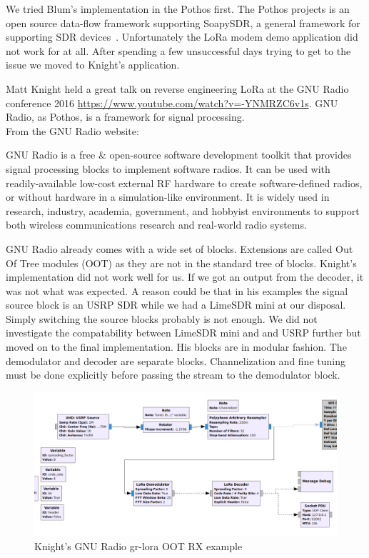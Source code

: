 We tried Blum's implementation in the Pothos  first. The Pothos projects is an open source data-flow framework
supporting SoapySDR, a general framework for supporting SDR devices~\cite{pothos}.
Unfortunately the LoRa modem demo application did not work for at all. After spending a few unsuccessful days 
trying to get to the issue we moved to Knight's application.

Matt Knight held a great talk on reverse engineering LoRa at the GNU Radio conference 2016 \url{https://www.youtube.com/watch?v=-YNMRZC6v1s}.
GNU Radio, as Pothos, is a framework for signal processing.\\
From the GNU Radio website:
\begin{displayquote}
    GNU Radio is a free \& open-source software development toolkit that provides signal processing
    blocks to implement software radios. It can be used with readily-available low-cost external
    RF hardware to create software-defined radios, or without hardware in a simulation-like environment.
    It is widely used in research, industry, academia, government, and hobbyist environments to support both wireless
    communications research and real-world radio systems.~\cite{gnuradio}
\end{displayquote}

GNU Radio already comes with a wide set of blocks. Extensions are called Out Of Tree modules (OOT) as they are not in the 
standard tree of blocks. Knight's implementation did not work well for us. If we got an output from the decoder, it was not 
what was expected. A reason could be that in his examples the signal source block is an USRP SDR while we had a LimeSDR mini 
at our disposal. Simply switching the source blocks probably is not enough. We did not investigate the compatability between LimeSDR mini
and and USRP further but moved on to the final implementation.
His blocks are in modular fashion. The demodulator and decoder are separate blocks. Channelization and fine tuning must be done 
explicitly before passing the stream to the demodulator block.

\begin{figure}[h]
    \centering
    \includegraphics[width=1\textwidth]{figures/matt_gnu_example.png}
    \caption{Knight's GNU Radio gr-lora OOT RX example~\cite{knight_implementation}}
    \label{fig:knight_gnu}
\end{figure}

